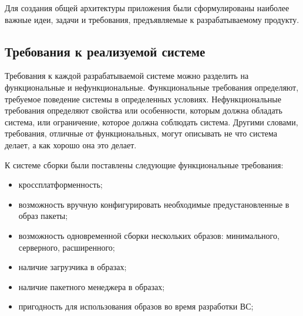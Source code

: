 Для создания общей архитектуры приложения были сформулированы наиболее важные идеи, задачи и требования, предъявляемые к разрабатываемому продукту.

\newpage
\subsection{Требования к реализуемой системе}

Требования к каждой разрабатываемой системе можно разделить на функциональные и нефункциональные\cite{REQUIREMENTS}.
Функциональные требования определяют, требуемое поведение системы в определенных условиях.
Нефункциональные требования определяют свойства или особенности, которым должна обладать система, или ограничение, которое должна соблюдать система.
Другими словами, требования, отличные от функциональных, могут описывать не что система делает, а как хорошо она это делает\cite{REQUIREMENTS}.

К системе сборки были поставлены следующие функциональные требования:
\begin{itemize}
  \item кроссплатформенность;
  \item возможность вручную конфигурировать необходимые предустановленные в образ пакеты;
  \item возможность одновременной сборки нескольких образов: минимального, серверного, расширенного;
  \item наличие загрузчика в образах;
  \item наличие пакетного менеджера в образах;
  \item пригодность для использования образов во время разработки ВС;
\end{itemize}
\newpage

